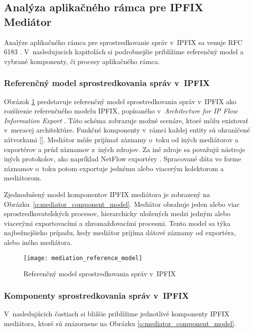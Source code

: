 \subsection{Analýza aplikačného rámca pre IPFIX Mediátor} \label{sec:framework}

Analýze aplikačného rámca pre sprostredkovanie správ v~IPFIX sa venuje RFC 6183 \citep{rfc6183}. 
V~nasledujucich kapitolách si podrobnejšie priblížime referenčný model a vybrané komponenty, či procesy 
aplikačného rámca.

\subsubsection{Referenčný model sprostredkovania správ v~IPFIX}


Obrázok \ref{o:mediation_reference_model} predstavuje referenčný model sprostredkovania správ v~IPFIX 
ako rozšírenie referenčného modelu IPFIX, popísaného v~\emph{Architecture for IP Flow Information Export} 
\citep{rfc5470}. Táto schéma zobrazuje možné scenáre, ktoré môžu existovať v~meracej architektúre.
Funkčné komponenty v~rámci každej entity sú ohraničené zátvorkami []. Mediátor môže prijímať 
záznamy o~toku od iných mediátorov a exportérov a prúd záznamov z~iných zdrojov.
Za iné zdroje sa považujú nástroje iných protokolov, ako napríklad NetFlow exportéry \citep{rfc3954}. 
Spracované dáta vo forme záznamov o~toku potom exportuje jednému alebo viacerým kolektorom a mediátorom.


Zjednodušený model komponentov IPFIX mediátora je zobrazený na Obrázku~\ref{o:mediator_component_model}. 
Mediátor obsahuje jeden alebo viac sprostredkovateľských procesov, hierarchicky uložených 
medzi jedným alebo viacerými exportovacími a zhromažďovacími procesmi. Tento model sa týka 
najbežnejšieho prípadu, kedy mediátor prijíma dátové záznamy od exportéra, alebo iného mediátora.

\begin{figure}[ht!]
\centering
\texttt{[image: mediation\_reference\_model]}
\caption{Referenčný model sprostredkovania správ v~IPFIX}\label{o:mediation_reference_model}
\end{figure}



\subsubsection{Komponenty sprostredkovania správ v~IPFIX}

V~nasledujúcich častiach si bližšie priblížime jednotlivé komponenty IPFIX mediátora, ktoré sú
znázornene na Obrázku \ref{o:mediator_component_model}.

